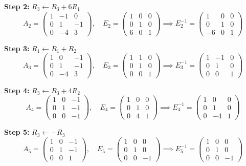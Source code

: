 \documentclass[12pt,a3paper]{article}
\begin{document}
\begin{tcolorbox}
\textbf{Step 2:} $R_3 \leftarrow R_3 + 6R_1$
\[
A_2 = \begin{pmatrix}1&-1&0\\0&1&-1\\0&-4&3\end{pmatrix}, \quad
E_2 = \begin{pmatrix}1&0&0\\0&1&0\\6&0&1\end{pmatrix} \implies E_2^{-1} = \begin{pmatrix}1&0&0\\0&1&0\\-6&0&1\end{pmatrix}
\]

\textbf{Step 3:} $R_1 \leftarrow R_1 + R_2$
\[
A_3 = \begin{pmatrix}1&0&-1\\0&1&-1\\0&-4&3\end{pmatrix}, \quad
E_3 = \begin{pmatrix}1&1&0\\0&1&0\\0&0&1\end{pmatrix} \implies E_3^{-1} = \begin{pmatrix}1&-1&0\\0&1&0\\0&0&1\end{pmatrix}
\]

\textbf{Step 4:} $R_3 \leftarrow R_3 + 4R_2$
\[
A_4 = \begin{pmatrix}1&0&-1\\0&1&-1\\0&0&-1\end{pmatrix}, \quad
E_4 = \begin{pmatrix}1&0&0\\0&1&0\\0&4&1\end{pmatrix} \implies E_4^{-1} = \begin{pmatrix}1&0&0\\0&1&0\\0&-4&1\end{pmatrix}
\]

\textbf{Step 5:} $R_3 \leftarrow -R_3$
\[
A_5 = \begin{pmatrix}1&0&-1\\0&1&-1\\0&0&1\end{pmatrix}, \quad
E_5 = \begin{pmatrix}1&0&0\\0&1&0\\0&0&-1\end{pmatrix} \implies E_5^{-1} = \begin{pmatrix}1&0&0\\0&1&0\\0&0&-1\end{pmatrix}
\]


\end{tcolorbox}
\end{document}
